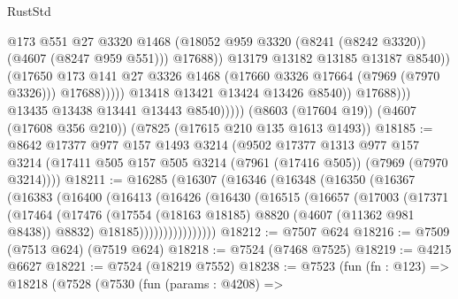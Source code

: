 \begin{lexlean}{RustStd}
\begin{coremodule}
                                        @173
                                        @551
                                        @27
                                        @3320
                                        @1468
                                        (@18052
                                          @959
                                          @3320
                                          (@8241 (@8242 @3320))
                                          (@4607 (@8247 @959 @551)))
                                        @17688))
                                    @13179
                                    @13182
                                    @13185
                                    @13187
                                    @8540))
                                (@17650
                                  @173
                                  @141
                                  @27
                                  @3326
                                  @1468
                                  (@17660 @3326 @17664 (@7969 (@7970 @3326)))
                                  @17688)))))
                        @13418
                        @13421
                        @13424
                        @13426
                        @8540))
                    @17688)))
              @13435
              @13438
              @13441
              @13443
              @8540)))))
    (@8603 (@17604 @19))
    (@4607 (@17608 @356 @210))
    (@7825 (@17615 @210 @135 @1613 @1493))
@18185 := @8642
    @17377
    @977
    @157
    @1493
    @3214
    (@9502
      @17377
      @1313
      @977
      @157
      @3214
      (@17411 @505 @157 @505 @3214 (@7961 (@17416 @505)) (@7969 (@7970 @3214))))
@18211 := @16285
    (@16307
      (@16346
        (@16348
          (@16350
            (@16367
              (@16383
                (@16400
                  (@16413
                    (@16426
                      (@16430
                        (@16515
                          (@16657
                            (@17003
                              (@17371
                                (@17464
                                  (@17476
                                    (@17554 (@18163 @18185) @8820 (@4607 (@11362 @981 @8438)) @8832)
                                    @18185))))))))))))))))
@18212 := @7507 @624
@18216 := @7509 (@7513 @624) (@7519 @624)
@18218 := @7524 (@7468 @7525)
@18219 := @4215 @6627
@18221 := @7524 (@18219 @7552)
@18238 := @7523
    (fun (fn : @123) =>
    @18218
      (@7528
        (@7530
          (fun (params : @4208) =>

\end{coremodule}
\end{lexlean}
